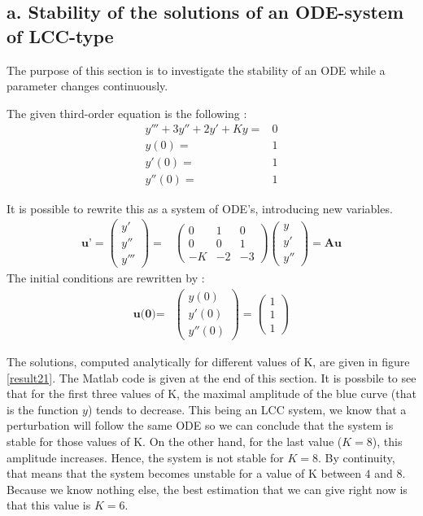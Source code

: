 \subsection*{a. Stability of the solutions of an ODE-system of LCC-type}
The purpose of this section is to investigate the stability of an ODE while a parameter changes continuously.

The given third-order equation is the following : 
\begin{eqnarray*}
y'''+3y''+2y'+Ky =& 0 \\
y(0) =& 1\\
y'(0)=&1\\
y''(0)=&1
\end{eqnarray*}

It is possible to rewrite this as a system of ODE's, introducing new variables.
\begin{eqnarray*}
\textbf{u'}  = \left( \begin{array}{c}
y' \\ 
y'' \\ 
y'''
\end{array} \right) =& \left( \begin{array}{ccc}
0 & 1 & 0 \\ 
0 & 0 & 1 \\ 
-K & -2 & -3
\end{array}  \right) \left( \begin{array}{c}
y \\ 
y'\\ 
y''
\end{array} \right) = \textbf{Au} 
\end{eqnarray*}
The initial conditions are rewritten by :
\begin{eqnarray*}
\textbf{u(0)} =& \left( \begin{array}{c}
y(0) \\ 
y'(0)\\ 
y''(0)
\end{array} \right) = \left( \begin{array}{c}
1\\ 
1\\ 
1
\end{array} \right) 
\end{eqnarray*}

The solutions, computed analytically for different values of K, are given in figure \ref{result21}. The Matlab code is given at the end of this section. It is possbile to see that for the first three values of K, the maximal amplitude of the blue curve (that is the function $y$) tends to decrease. This being an LCC system, we know that a perturbation will follow the same ODE so we can conclude that the system is stable for those values of K. On the other hand, for the last value ($K=8$), this amplitude increases. Hence, the system is not stable for $K=8$. By continuity, that means that the system becomes unstable for a value of K between $4$ and $8$. Because we know nothing else, the best estimation that we can give right now is that this value is $K=6$. \\

